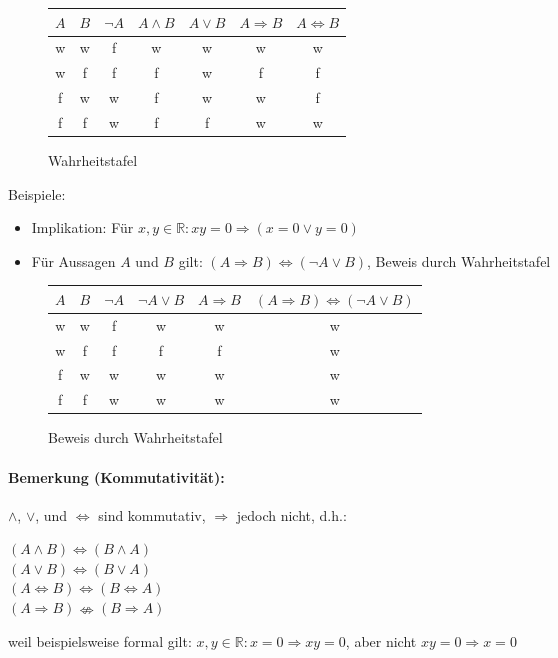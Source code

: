 \documentclass[12pt,a4paper,parskip=half-,DIV=15]{scrartcl}
\begin{document}
\begin{figure}[H]\centering
\begin{tabular}{c|c|c|c|c|c|c}
$A$ & $B$ & $\lnot A$ & $A\land B$ &$A\lor B$&$A \Rightarrow B$ & $A\Leftrightarrow B$\\\hline
w & w & f & w & w & w & w\\
w & f & f & f & w & f & f\\
f & w & w & f & w & w & f\\
f & f & w & f & f & w & w\\
\end{tabular}
\caption{Wahrheitstafel}
\end{figure}
Beispiele:
\begin{itemize}
\item Implikation: Für $x,y\in\mathbb{R}: xy = 0 \Rightarrow (x = 0\lor y = 0)$
\item Für Aussagen $ A $ und $ B $ gilt: $(A\Rightarrow B)\Leftrightarrow (\lnot A \lor B)$, Beweis durch Wahrheitstafel
\end{itemize}
\begin{figure}[H]\centering
\begin{tabular}{c|c|c|c|c|c}
$A$ & $B$ & $\lnot A$ & $\lnot A\lor B$ & $A \Rightarrow B$ & $(A\Rightarrow B)\Leftrightarrow (\lnot A \lor B)$\\\hline
w & w & f & w & w & w \\
w & f & f & f & f & w \\
f & w & w & w & w & w \\
f & f & w & w & w & w \\
\end{tabular}
\caption{Beweis durch Wahrheitstafel}
\end{figure}
\paragraph{Bemerkung (Kommutativität):} $\land$, $\lor$, und $\Leftrightarrow$ sind kommutativ, $\Rightarrow$ jedoch nicht, d.h.:
\begin{center}
$(A\land B)\Leftrightarrow (B\land A)$\\
$(A\lor B)\Leftrightarrow (B\lor A)$\\
$(A\Leftrightarrow B)\Leftrightarrow (B\Leftrightarrow A)$\\
$(A\Rightarrow B)\nLeftrightarrow (B\Rightarrow A)$\\
\end{center}
weil beispielsweise formal gilt: $x,y\in\mathbb{R}: x = 0 \Rightarrow xy = 0$, aber nicht $xy = 0 \Rightarrow x = 0$
\end{document}
